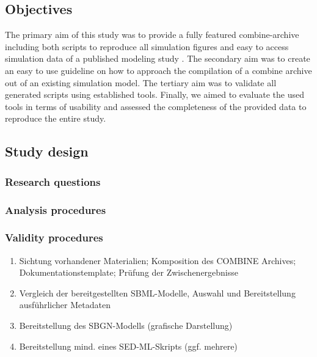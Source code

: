 \subsection*{Objectives}
The primary aim of this study was to provide a fully featured \acs{combine}-archive including both scripts to reproduce all simulation figures and easy to access simulation data of a published modeling study \cite{bachmannmodel}. The secondary aim was to create an easy to use guideline on how to approach the compilation of a \acs{combine} archive out of an existing simulation model. The tertiary aim was to validate all generated scripts using established tools. Finally, we aimed to evaluate the used tools in terms of usability and assessed the completeness of the provided data to reproduce the entire study.

\subsection*{Study design} %

\subsubsection*{Research questions}
\subsubsection*{Analysis procedures}
\subsubsection*{Validity procedures}

\begin{enumerate}
    \item Sichtung vorhandener Materialien; Komposition des COMBINE Archives; Dokumentationstemplate; Prüfung der Zwischenergebnisse
    \item Vergleich der bereitgestellten SBML-Modelle, Auswahl und Bereitstellung ausführlicher Metadaten
    \item Bereitstellung des SBGN-Modells (grafische Darstellung) 
    \item Bereitstellung mind. eines SED-ML-Skripts (ggf. mehrere)
\end{enumerate}


